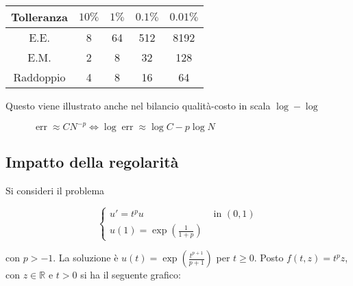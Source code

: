 \documentclass[hidelinks, 10pt]{report}
\begin{document}
\begin{tabular}{c|c|c|c|c}
	Tolleranza & $ 10\% $ & $ 1\% $ & $ 0.1\% $ & $ 0.01\% $ \\
\hline
	E.E. & 8 & 64 & 512 & 8192 \\
\hline
	E.M. & 2 & 8 & 32 & 128 \\
\hline
	Raddoppio & 4 & 8 & 16 & 64 \\
\end{tabular}

Questo viene illustrato anche nel bilancio qualit\`a-costo in scala $ \log-\log $

\begin{center}
\begin{figure}[H]

\caption{$ \mathop{err} \approx C N^{-p} \iff \log \mathop{err} \approx \log C - p \log N $}
\end{figure}
\end{center}

\subsection{Impatto della regolarit\`a}
Si consideri il problema

\[
\begin{cases}
u' = t^{p} u & \text{ in } (0, 1) \\
u(1) = \exp \left( \frac{1}{1 + p} \right) 
\end{cases}
\]

con $ p > -1 $. La soluzione \`e $ u(t) = \exp \left( \frac{t^{p + 1}}{p + 1} \right) $ per $ t \ge 0 $. Posto $ f(t, z) = t^{p} z $, con $ z \in \mathbb{R} $ e $ t > 0 $ si ha il seguente grafico:
\end{document}
